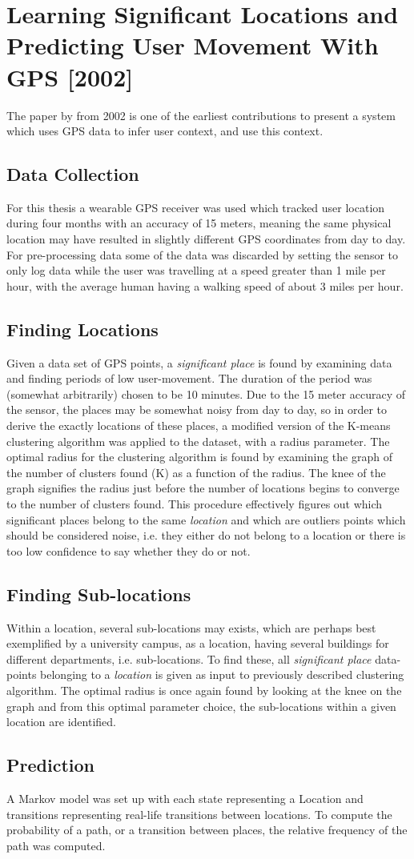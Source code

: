 \section{Learning Significant Locations and Predicting User Movement With GPS [2002]}
The paper by \cite{learning_significant_locations} from 2002 is one of the earliest contributions to present a system which uses GPS data to infer user context, and use this context. 

\subsection{Data Collection}
For this thesis a wearable GPS receiver was used which tracked user location during four months with an accuracy of 15 meters, meaning the same physical location may have resulted in slightly different GPS coordinates from day to day. For pre-processing data some of the data was discarded by setting the sensor to only log data while the user was travelling at a speed greater than 1 mile per hour, with the average human having a walking speed of about 3 miles per hour. 

\subsection{Finding Locations}
Given a data set of GPS points, a \textit{significant place} is found by examining data and finding periods of low user-movement. The duration of the period was (somewhat arbitrarily) chosen to be 10 minutes. Due to the 15 meter accuracy of the sensor, the places may be somewhat noisy from day to day, so in order to derive the exactly locations of these places, a modified version of the K-means clustering algorithm was applied to the dataset, with a radius parameter. The optimal radius for the clustering algorithm is found by examining  the graph of the number of clusters found (K) as a function of the radius. The knee of the graph signifies the radius just before the number of locations begins to converge to the number of clusters found. This procedure effectively figures out which significant places belong to the same \textit{location} and which are outliers points which should be considered noise, i.e. they either do not belong to a location or there is too low confidence to say whether they do or not. 

\subsection{Finding Sub-locations}
Within a location, several sub-locations may exists, which are perhaps best exemplified by a university campus, as a location, having several buildings for different departments, i.e. sub-locations. To find these, all \textit{significant place} data-points belonging to a \textit{location} is given as input to previously described clustering algorithm. The optimal radius is once again found by looking at the knee on the graph and from this optimal parameter choice, the sub-locations within a given location are identified.

\subsection{Prediction}
A Markov model was set up with each state representing a Location and transitions representing real-life transitions between locations. To compute the probability of a path, or a transition between places, the relative frequency of the path was computed.

